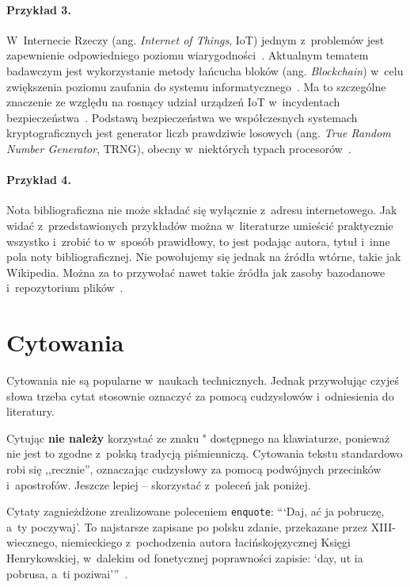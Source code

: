 \paragraph{Przykład 3.} W~Internecie Rzeczy (ang. \textit{Internet of Things}, IoT) jednym z~problemów jest zapewnienie odpowiedniego poziomu wiarygodności~\cite{truong2018}. Aktualnym tematem badawczym jest wykorzystanie metody łańcucha bloków (ang. \textit{Blockchain}) w~celu zwiększenia poziomu zaufania do systemu informatycznego~\cite{poirier2020}. Ma to szczególne znaczenie ze względu na rosnący udział urządzeń IoT w~incydentach bezpieczeństwa~\cite{nask2020}. Podstawą bezpieczeństwa we współczesnych systemach kryptograficznych jest generator liczb prawdziwie losowych (ang. \textit{True Random Number Generator}, TRNG), obecny w~niektórych typach procesorów~\cite{AN4230}.

\paragraph{Przykład 4.} Nota bibliograficzna nie może składać się wyłącznie z~adresu internetowego. Jak widać z~przedstawionych przykładów można w~literaturze umieścić praktycznie wszystko i~zrobić to w~sposób prawidłowy, to jest podając autora, tytuł i~inne pola noty bibliograficznej. Nie powołujemy się jednak na źródła wtórne, takie jak Wikipedia. Można za to przywołać nawet takie źródła jak zasoby bazodanowe i~repozytorium plików~\cite{szablon}.

\section{Cytowania}
Cytowania nie są popularne w~naukach technicznych. Jednak przywołując czyjeś słowa trzeba cytat stosownie oznaczyć za pomocą cudzysłowów i~odniesienia do literatury.

Cytując \textbf{nie należy} korzystać ze znaku " dostępnego na klawiaturze, ponieważ nie jest to zgodne z~polską tradycją piśmienniczą. Cytowania tekstu standardowo robi się ,,recznie'', oznaczając cudzysłowy za pomocą podwójnych przecinków i~apostrofów. Jeszcze lepiej -- skorzystać z~poleceń jak poniżej.

Cytaty zagnieżdżone zrealizowane poleceniem \texttt{enquote}:
\enquote{\enquote{Daj, ać ja pobruczę, a~ty poczywaj}. To najstarsze zapisane po polsku zdanie, przekazane przez XIII-wiecznego, niemieckiego z~pochodzenia autora łacińskojęzycznej Księgi Henrykowskiej, w~dalekim od fonetycznej poprawności zapisie: \enquote{day, ut ia pobrusa, a~ti poziwai}}~\cite{wilamowski2017}.

